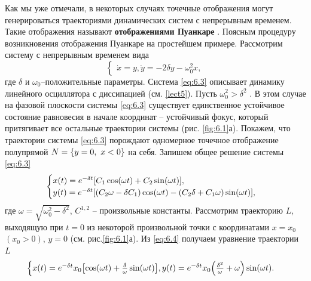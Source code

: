 Как мы уже отмечали,  в некоторых случаях точечные отображения могут
генерироваться траекториями динамических систем с непрерывным временем.
Такие отображения называют \textbf{отображениями Пуанкаре} . Поясным процедуру
возникновения отображения Пуанкаре на простейшем примере. Рассмотрим
систему с непрерывным временем вида
\begin{equation}
        \label{eq:6.3}
        \begin{cases}
                \dot x = y,
                \dot y = -2 \delta y - \omega_0^2 x,
        \end{cases}
\end{equation}
где $\delta$ и $\omega_0$--положительные параметры. 
Система \eqref{eq:6.3} описывает динамику
линейного осциллятора с диссипацией (см. \ref{lect5}). Пусть $\omega_0^2>\delta^2$ . В этом
случае на фазовой плоскости системы \eqref{eq:6.3} существует единственное
устойчивое состояние равновесия в начале координат -- устойчивый фокус,
который притягивает все остальные траектории системы (рис. \ref{fig:6.1}а). Покажем,
что траектории системы \eqref{eq:6.3} порождают одномерное точечное отображение
полупрямой $N = \qty{y=0, ~ x<0}$ на себя. Запишем общее решение системы \eqref{eq:6.3}
\begin{equation}
        \label{eq:6.4}
        \begin{cases}
                x(t) = e^{-\delta t} \qty[ C_1 \cos(\omega t) + C_2 \sin(\omega t) ],\\
                y(t) = e^{-\delta t} \qty[ (C_2 \omega - \delta C_1) \cos(\omega t) - (C_2 \delta + C_1 \omega) \sin( \omega t) ],  
        \end{cases}
\end{equation}
где $\omega = \sqrt{ \omega_0^2 - \delta ^2}$, $C^{1,2}$ -- произвольные константы. Рассмотрим траекторию $L$,
выходящую при $t=0$ из некоторой произвольной точки с координатами $x=x_{0}$ 
$(x_0>0)$, $y=0$ (см. рис.\ref{fig:6.1}а). Из \eqref{eq:6.4} получаем уравнение траектории $L$ 
\begin{equation}
        \label{eq:6.5}
        \begin{cases}
                x(t) = e^{-\delta t} x_0 \qty[ \cos(\omega t) + \frac{\delta}{\omega} \sin(\omega t) ],
                y(t) = e^{- \delta t} x_0 \qty( \frac{\delta^2}{\omega} + \omega)   \sin(\omega t).
        \end{cases}
\end{equation}

